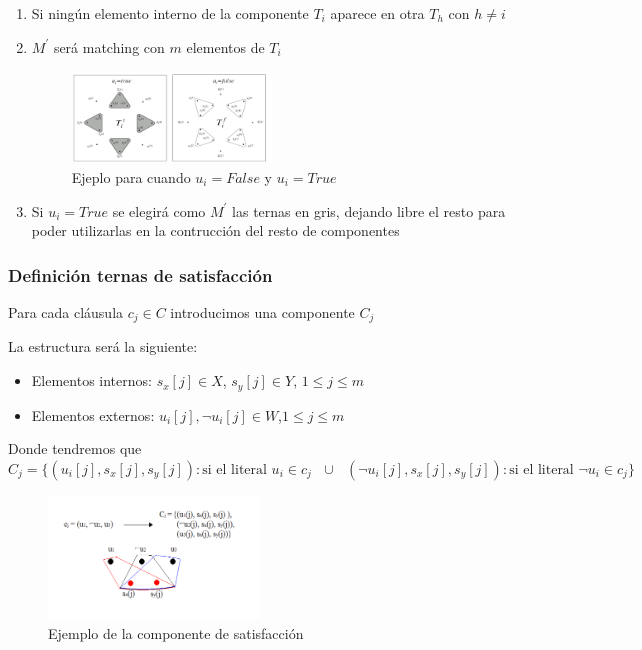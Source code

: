 \documentclass{article}
\begin{document}
\begin{enumerate}
    \item Si ningún elemento interno de la componente $T_i$ aparece en otra $T_h$
con $h \neq i$
    \item $M^{'}$ será matching con $m$ elementos de $T_i$
    \begin{figure}[H]
        \centering
        \includegraphics[width=0.5\textwidth]{photos/ternas_asignacion_con_uifalse_ui_true.png}
        \caption{Ejeplo para cuando $u_i = False $ y $u_i = True$}
        \label{fig:etiqueta}
    \end{figure}

    \item Si $u_i =True$ se elegirá como $M^{'}$ las ternas en gris, dejando libre el resto para poder utilizarlas en la contrucción del resto de componentes
    
\end{enumerate}

 
\subsubsection{Definición ternas de satisfacción}
Para cada cláusula $c_j \in C$ introducimos una componente $C_j$

La estructura será la siguiente:
\begin{itemize}
    \item Elementos internos: $s_x[j] \in X$, $s_y[j] \in Y $, $1 \leq j \leq m$
    \item Elementos externos: $u_i[j], \lnot u_i[j] \in W $,$1 \leq j \leq m$
    
\end{itemize}

Donde tendremos que $C_j=\{(u_i[j],s_x[j],s_y[j]):\text{si el literal $u_i \in c_j$  } \cup \text{ } (\lnot u_i[j],s_x[j],s_y[j]):\text{si el literal $\lnot u_i \in c_j$}\} $

\begin{figure}[H]
    \centering
    \includegraphics[width=0.5\textwidth]{photos/ejemplo_componente_satisfaccion.png}
    \caption{Ejemplo de la componente de satisfacción}
    \label{fig:etiqueta}
\end{figure}
\end{document}
